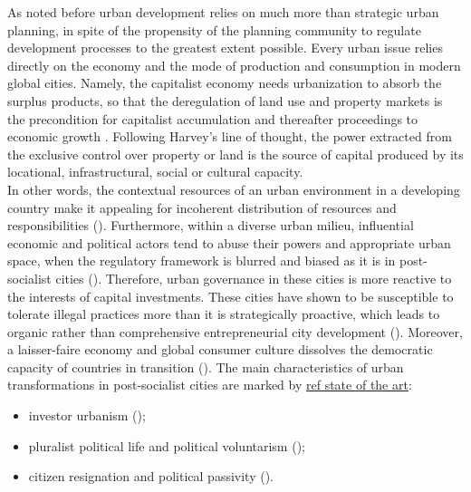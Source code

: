 \documentclass[11pt]{report}
\begin{document}
As noted before urban development relies on much more than strategic urban planning, in spite of the propensity of the planning community to regulate development processes to the greatest extent possible. Every urban issue relies directly on the economy and the mode of production and consumption in modern global cities.
Namely, the capitalist economy needs urbanization to absorb the surplus products, so that the deregulation of land use and property markets is the precondition for capitalist accumulation and thereafter proceedings to economic growth \cite{(Harvey 2012)}. Following Harvey’s line of thought, the power extracted from the exclusive control over property or land is the source of capital produced by its locational, infrastructural, social or cultural capacity.
\\
In other words, the contextual resources of an urban environment in a developing country make it appealing for incoherent distribution of resources and responsibilities (\cite{(Bolay et al. 2005)}). Furthermore, within a diverse urban milieu, influential economic and political actors tend to abuse their powers and appropriate urban space, when the regulatory framework is blurred and biased as it is in post-socialist cities (\cite{(Djokic et al. 2007)}). 
Therefore, urban governance in these cities is more reactive to the interests of capital investments.
These cities have shown to be susceptible to tolerate illegal practices more than it is strategically proactive, which leads to organic rather than comprehensive entrepreneurial city development (\href{}{\citealt{petrovic_cities_2009}}).
Moreover, a laisser-faire economy and global consumer culture  dissolves the democratic capacity of countries in transition (\cite{(Ellin 1999)}). The main characteristics of urban transformations in post-socialist cities are marked by \href{}{ref state of the art}:

\begin{itemize}
\item investor urbanism (\cite{(Vujosevic 2010)});
\item pluralist political life and political voluntarism (\cite{(Djokic et al. 2007)});
\item citizen resignation and political passivity (\href{}{\citealt{vujovic_belgrades_2007}}).
\end{itemize}
\end{document}
